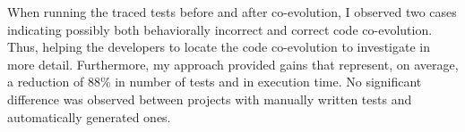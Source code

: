	When running the traced tests before and after co-evolution, I observed two cases indicating possibly both behaviorally incorrect and correct code co-evolution. Thus, helping the developers to locate the code co-evolution to investigate in more detail. Furthermore, my approach provided gains that represent, on average, a reduction of 88\% in number of tests and  in execution time. No significant difference was observed between projects with manually written tests and automatically generated ones.   






